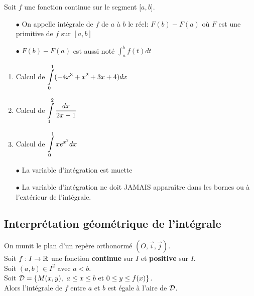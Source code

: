 \documentclass[a4paper, 11pt]{article}
\begin{document}
{

\begin{defi}
	Soit $f$ une fonction continue sur le segment $\lbrack a,b\rbrack$.
	\begin{itemize}
		\item[$\bullet$] On appelle int\'egrale de $f$ de $a$ \`a $b$ le r\'eel: $F(b)- F(a)$ où $F$ est une primitive de $f$ sur $[a,b]$
		\item[$\bullet$] $F(b)-F(a)$ est aussi not\'e $\int_a^b f(t) dt$
	\end{itemize}
\end{defi}



{\footnotesize \begin{exo}
	\begin{enumerate}
		\item Calcul de $\displaystyle \int\limits_{0}^1 (-4x^3+x^2+3x+4)dx$
		\item Calcul de $\displaystyle \int\limits_{1}^2  \displaystyle\frac{dx}{2x-1}$
		\item Calcul de $\displaystyle \int\limits_{0}^1 xe^{x^2} dx$
	\end{enumerate}
\end{exo}}

\begin{rems}
	\begin{itemize}
		\item[$\bullet$] La variable d'int\'egration est   muette
		\item[$\bullet$] La variable d'int\'egration ne doit JAMAIS appara\^itre dans les bornes ou \`a l'ext\'erieur de l'int\'egrale.
	\end{itemize}
\end{rems}

\subsection{Interpr\'etation g\'eom\'etrique de l'int\'egrale}


On munit le plan d'un rep\`ere orthonorm\'e $(O,\vec{i},\vec{j})$.\\
Soit $f: I\rightarrow \mathbb{R}$ une fonction \textbf{continue} sur $I$ et \textbf{positive} sur $I$.\\
Soit $(a,b)\in I^2$ avec $a<b$. \\
Soit $\mathcal{D}=\left\lbrace M(x,y),\  a\leq x\leq b\ \hbox{et}\ 0\leq y\leq f(x)\right\rbrace.$\vsec\\
Alors l'int\'egrale de $f$ entre $a$ et $b$ est \'egale \`a l'aire de $\mathcal{D}$.




}
\end{document}
